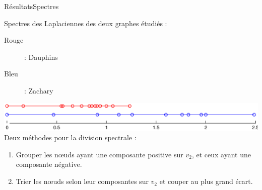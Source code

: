 \documentclass{beamer}
\begin{document}
\begin{frame}{Résultats}{Spectres}
		\begin{center}
			Spectres des Laplaciennes des deux graphes étudiés :
			\begin{description}
				\item[\alert{Rouge}] : Dauphins
				\item[Bleu] : Zachary
			\end{description}
			\bigskip
			\includegraphics[width=\textwidth]{new_plots/spectres}\\
			\bigskip
			Deux méthodes pour la division spectrale :
			\begin{enumerate}
				\item Grouper les n\oe uds ayant une composante positive sur $v_2$, et ceux ayant une composante négative.
				\item Trier les n\oe uds selon leur composantes sur $v_2$ et couper au plus grand écart.
			\end{enumerate}
		\end{center}
\end{frame}
\end{document}
